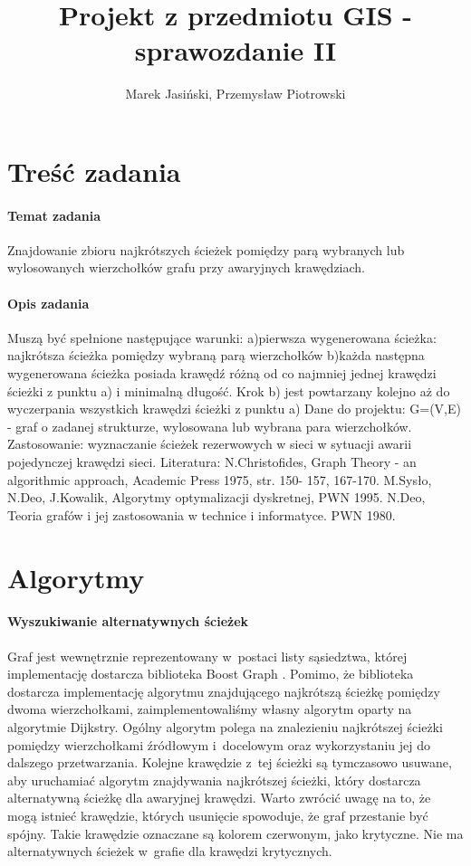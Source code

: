 \documentclass[a4paper, 12pt]{article}
\title {Projekt z przedmiotu GIS - sprawozdanie II}
\author{Marek Jasiński, Przemysław Piotrowski}
\begin{document}
\maketitle

\section{Treść zadania}

\paragraph{Temat zadania}
Znajdowanie zbioru najkrótszych ścieżek pomiędzy parą wybranych lub wylosowanych wierzchołków grafu przy awaryjnych krawędziach.

\paragraph{Opis zadania}
Muszą być spełnione następujące warunki: a)pierwsza wygenerowana ścieżka: najkrótsza ścieżka pomiędzy wybraną parą wierzchołków b)każda następna wygenerowana ścieżka posiada krawędź różną od co najmniej jednej krawędzi ścieżki z punktu a) i minimalną długość. Krok b) jest powtarzany kolejno aż do wyczerpania wszystkich krawędzi ścieżki z punktu a) Dane do projektu: G=(V,E) - graf o zadanej strukturze, wylosowana lub wybrana para wierzchołków. Zastosowanie: wyznaczanie ścieżek rezerwowych w sieci w sytuacji awarii pojedynczej krawędzi sieci. Literatura: N.Christofides, Graph Theory - an algorithmic approach, Academic Press 1975, str. 150- 157, 167-170. M.Sysło, N.Deo, J.Kowalik, Algorytmy optymalizacji dyskretnej, PWN 1995. N.Deo, Teoria grafów i jej zastosowania w technice i informatyce. PWN 1980.

\section{Algorytmy}

\paragraph{Wyszukiwanie alternatywnych ścieżek}

Graf jest wewnętrznie reprezentowany w~postaci listy sąsiedztwa, której implementację dostarcza biblioteka Boost Graph \cite{bgl}. Pomimo, że biblioteka dostarcza implementację algorytmu znajdującego najkrótszą ścieżkę pomiędzy dwoma wierzchołkami, zaimplementowaliśmy własny algorytm oparty na algorytmie Dijkstry. Ogólny algorytm polega na znalezieniu najkrótszej ścieżki pomiędzy wierzchołkami źródłowym i~docelowym oraz wykorzystaniu jej do dalszego przetwarzania. Kolejne krawędzie z~tej ścieżki są tymczasowo usuwane, aby uruchamiać algorytm znajdywania najkrótszej ścieżki, który dostarcza alternatywną ścieżkę dla awaryjnej krawędzi. Warto zwrócić uwagę na to, że mogą istnieć krawędzie, których usunięcie spowoduje, że graf przestanie być spójny. Takie krawędzie oznaczane są kolorem czerwonym, jako krytyczne. Nie ma alternatywnych ścieżek w~grafie dla krawędzi krytycznych.
\end{document}
